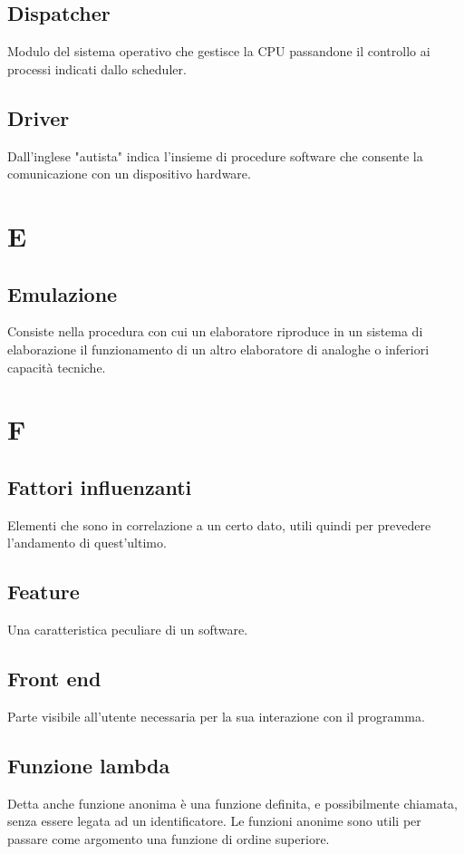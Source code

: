 \subsection*{Dispatcher}
Modulo del sistema operativo che gestisce la CPU passandone il controllo ai processi indicati dallo scheduler.

\subsection*{Driver}
Dall'inglese "autista" indica l'insieme di procedure software che consente la comunicazione con un dispositivo hardware.

\clearpage
\section*{E}

\subsection*{Emulazione}
Consiste nella procedura con cui un elaboratore riproduce in un sistema di elaborazione il funzionamento di un altro elaboratore di analoghe o inferiori capacità tecniche.

\clearpage
\section*{F}

\subsection*{Fattori influenzanti}
Elementi che sono in correlazione a un certo dato, utili quindi per prevedere l'andamento di quest'ultimo.

\subsection*{Feature}
Una caratteristica peculiare di un software.

\subsection*{Front end}
Parte visibile all'utente necessaria per la sua interazione con il programma.

\subsection*{Funzione lambda}
Detta anche funzione anonima è una funzione definita, e possibilmente chiamata, senza essere legata ad un identificatore. Le funzioni anonime sono utili per passare come argomento una funzione di ordine superiore.


